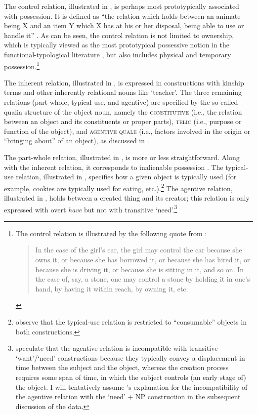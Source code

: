 \documentclass[output=paper]{langscibook}
\begin{document}
The control relation, illustrated in , is perhaps most prototypically associated with possession. It is defined as ``\label{ViknerJensen-control}the relation which holds between an animate being X and an item Y which X has at his or her disposal, being able to use or handle it'' \citep[196--197]{Vikner.Jensen2002}. As can be seen, the control relation is not limited to ownership, which is typically viewed as the most prototypical possessive notion in the functional-typological literature \citep[see, e.g.,][]{Heine1997}, but also includes physical and temporary possession.\footnote{The control relation is illustrated by the following quote from \citeauthor{Vikner.Jensen2002}:
\begin{quote}In the case of the girl's car, the girl may control the car because she owns it, or because she has borrowed it, or because she has hired it, or because she is driving it, or because she is sitting in it, and so on. In the case of, say, a stone, one may control a stone by holding it in one's hand, by having it within reach, by owning it, etc. \hfill  \citep[196--197]{Vikner.Jensen2002}
\end{quote}}

The inherent relation, illustrated in , is expressed in constructions with kinship terms and other inherently relational nouns like `teacher'. The three remaining relations (part-whole, typical-use, and agentive) are specified by the so-called qualia structure of the object noun, namely the \textsc{constitutive} (i.e., the relation between an object and its constituents or proper parts), \textsc{telic} (i.e., purpose or function of the object), and \textsc{agentive quale} (i.e., factors involved in the origin or ``bringing about'' of an object), as discussed in \citet{Pustejovsky1995}.

The part-whole relation, illustrated in , is more or less straightforward. Along with the inherent relation, it corresponds to inalienable possession \citep[see][]{Heine1997}. The typical-use relation, illustrated in , specifies how a given object is typically used (for example, cookies are typically used for eating, etc.).\footnote{\citet{Zaroukian.Beller2013} observe that the typical-use relation is restricted to ``consumable'' objects in both constructions.\label{footnote-cosummable}} The agentive relation, illustrated in , holds between a created thing and its creator; this relation is only expressed with overt \textit{have} but not with transitive `need'.\footnote{\citet{Zaroukian.Beller2013} speculate that the agentive relation is incompatible with transitive `want'/`need' constructions because they typically convey a displacement in time between the subject and the object, whereas the creation process requires some span of time, in which the subject controls (an early stage of) the object. I will tentatively assume \citeauthor{Zaroukian.Beller2013}'s explanation for the incompatibility of the agentive relation with the `need' + NP construction in the subsequent discussion of the  data.\label{footnote-agentive}}
\end{document}
